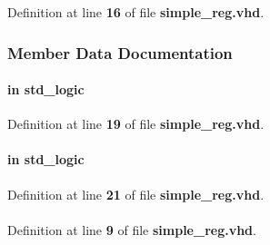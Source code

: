 Definition at line {\bf 16} of file {\bf simple\+\_\+reg.\+vhd}.



\subsubsection{Member Data Documentation}
\paragraph[{clk}]{ {\bfseries \textcolor{keywordflow}{in}\textcolor{vhdlchar}{ }} {\bfseries \textcolor{comment}{std\+\_\+logic}\textcolor{vhdlchar}{ }} \hspace{0.3cm}{\ttfamily [Port]}}\label{classsimple__reg_a4a4609c199d30b3adebbeb3a01276ec5}


Definition at line {\bf 19} of file {\bf simple\+\_\+reg.\+vhd}.

\paragraph[{d}]{ {\bfseries \textcolor{keywordflow}{in}\textcolor{vhdlchar}{ }} {\bfseries \textcolor{comment}{std\+\_\+logic}\textcolor{vhdlchar}{ }} \hspace{0.3cm}{\ttfamily [Port]}}\label{classsimple__reg_ac4c0bb47d2fcb4f40434914613b92b6d}


Definition at line {\bf 21} of file {\bf simple\+\_\+reg.\+vhd}.

\paragraph[{ieee}]{\hspace{0.3cm}{\ttfamily [Library]}}\label{classsimple__reg_a0a6af6eef40212dbaf130d57ce711256}


Definition at line {\bf 9} of file {\bf simple\+\_\+reg.\+vhd}.

\paragraph[{numeric\+\_\+std}]{\hspace{0.3cm}{\ttfamily [Package]}}\label{classsimple__reg_a2edc34402b573437d5f25fa90ba4013e}


